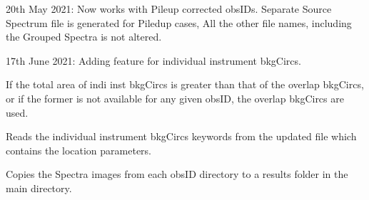 \documentclass[letterpaper,10pt,english]{sphinxmanual}
\begin{document}
\begin{fulllineitems}
\begin{fulllineitems}
\sphinxAtStartPar
20th May 2021: Now works with Pile\sphinxhyphen{}up corrected obsIDs.
Separate Source Spectrum file is generated for Piled\sphinxhyphen{}up cases,
All the other file names, including the Grouped Spectra is not altered.

\sphinxAtStartPar
17th June 2021: Adding feature for individual instrument bkgCircs.

\sphinxAtStartPar
If the total area of indi inst bkgCircs is greater than that of the overlap bkgCircs,
or if the former is not available for any given obsID, the overlap bkgCircs
are used.

\end{fulllineitems}


\begin{fulllineitems}
\label{\detokenize{xmmPipeline:xmmPipeline.epicSpectra.epicSpectra.readUpdatedCCDcoordsPickle}}
\pysigstartsignatures
{}
\pysigstopsignatures
\sphinxAtStartPar
Reads the individual instrument bkgCircs keywords from the updated
 file which contains the location parameters.

\end{fulllineitems}


\begin{fulllineitems}
\label{\detokenize{xmmPipeline:xmmPipeline.epicSpectra.epicSpectra.save_spectraResults}}
\pysigstartsignatures
{}
\pysigstopsignatures\begin{description}
\sphinxAtStartPar
Copies the Spectra images from each obsID directory to a results
folder in the main directory.

\end{description}

\end{fulllineitems}



\end{fulllineitems}
\end{document}
